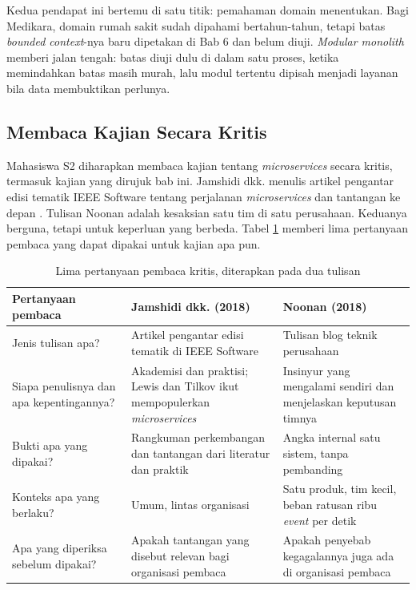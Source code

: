 Kedua pendapat ini bertemu di satu titik: pemahaman domain menentukan. Bagi Medikara, domain rumah
sakit sudah dipahami bertahun-tahun, tetapi batas \textit{bounded context}-nya baru dipetakan di Bab
6 dan belum diuji. \textit{Modular monolith} memberi jalan tengah: batas diuji dulu di dalam satu
proses, ketika memindahkan batas masih murah, lalu modul tertentu dipisah menjadi layanan bila data
membuktikan perlunya.

\subsection{Membaca Kajian Secara Kritis}

Mahasiswa S2 diharapkan membaca kajian tentang \textit{microservices} secara kritis, termasuk kajian
yang dirujuk bab ini. Jamshidi dkk. menulis artikel pengantar edisi tematik IEEE Software tentang
perjalanan \textit{microservices} dan tantangan ke depan \cite{jamshidi2018}. Tulisan Noonan adalah
kesaksian satu tim di satu perusahaan. Keduanya berguna, tetapi untuk keperluan yang berbeda. Tabel
\ref{tab:ch07-baca-kritis} memberi lima pertanyaan pembaca yang dapat dipakai untuk kajian apa pun.

\begin{table}[!htb]
  \centering
  \caption{Lima pertanyaan pembaca kritis, diterapkan pada dua tulisan}
  \label{tab:ch07-baca-kritis}
  \footnotesize
  \begin{tabularx}{\textwidth}{>{\raggedright\arraybackslash}p{2.6cm} >{\raggedright\arraybackslash}X >{\raggedright\arraybackslash}X}
    \hline
    \textbf{Pertanyaan pembaca} & \textbf{Jamshidi dkk. (2018)} & \textbf{Noonan (2018)} \\ \hline
    Jenis tulisan apa? & Artikel pengantar edisi tematik di IEEE Software & Tulisan blog teknik
      perusahaan \\ \hline
    Siapa penulisnya dan apa kepentingannya? & Akademisi dan praktisi; Lewis dan Tilkov ikut
      mempopulerkan \textit{microservices} & Insinyur yang mengalami sendiri dan menjelaskan
      keputusan timnya \\ \hline
    Bukti apa yang dipakai? & Rangkuman perkembangan dan tantangan dari literatur dan praktik &
      Angka internal satu sistem, tanpa pembanding \\ \hline
    Konteks apa yang berlaku? & Umum, lintas organisasi & Satu produk, tim kecil, beban ratusan
      ribu \textit{event} per detik \\ \hline
    Apa yang diperiksa sebelum dipakai? & Apakah tantangan yang disebut relevan bagi organisasi
      pembaca & Apakah penyebab kegagalannya juga ada di organisasi pembaca \\ \hline
  \end{tabularx}
\end{table}

